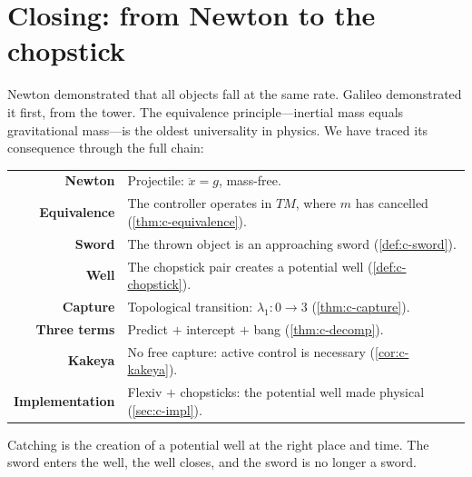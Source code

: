 \section*{Closing: from Newton to the chopstick}

Newton demonstrated that all objects fall at the same rate.
Galileo demonstrated it first, from the tower.  The equivalence
principle---inertial mass equals gravitational mass---is the
oldest universality in physics.  We have traced its consequence
through the full chain:

\begin{center}
\begin{tabular}{@{}rl@{}}
\textbf{Newton} & Projectile: $\ddot{x} = g$, mass-free. \\
\textbf{Equivalence} & The controller operates in $TM$, where
  $m$ has cancelled (\cref{thm:c-equivalence}). \\
\textbf{Sword} & The thrown object is an approaching sword
  (\cref{def:c-sword}). \\
\textbf{Well} & The chopstick pair creates a potential well
  (\cref{def:c-chopstick}). \\
\textbf{Capture} & Topological transition: $\lambda_1\colon 0
  \to 3$ (\cref{thm:c-capture}). \\
\textbf{Three terms} & Predict $+$ intercept $+$ bang
  (\cref{thm:c-decomp}). \\
\textbf{Kakeya} & No free capture: active control is necessary
  (\cref{cor:c-kakeya}). \\
\textbf{Implementation} & Flexiv $+$ chopsticks: the potential
  well made physical (\cref{sec:c-impl}).
\end{tabular}
\end{center}

Catching is the creation of a potential well at the right place
and time.  The sword enters the well, the well closes, and the
sword is no longer a sword.
